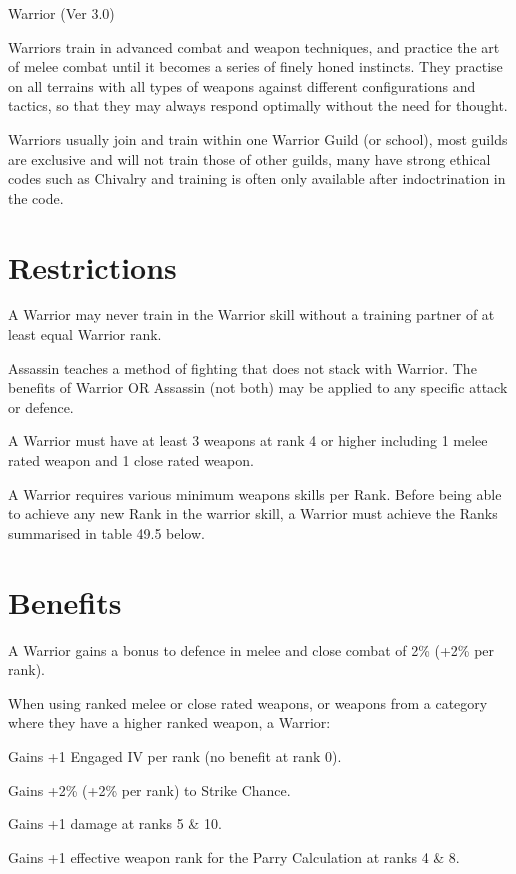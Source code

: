 \begin{Chapter}{Warrior (Ver 3.0)}

Warriors train in advanced combat and weapon techniques, and practice
the art of melee combat until it becomes a series of finely honed
instincts.  They practise on all terrains with all types of weapons
against different configurations and tactics, so that they may always
respond optimally without the need for thought.

Warriors usually join and train within one Warrior Guild (or school),
most guilds are exclusive and will not train those of other guilds,
many have strong ethical codes such as Chivalry and training is often
only available after indoctrination in the code.

\section{Restrictions}

A Warrior may never train in the Warrior skill without a training
partner of at least equal Warrior rank.

Assassin teaches a method of fighting that does not stack with
Warrior.  The benefits of Warrior OR Assassin (not both) may be
applied to any specific attack or defence.

A Warrior must have at least 3 weapons at rank 4 or higher including 1
melee rated weapon and 1 close rated weapon.

A Warrior requires various minimum weapons skills per Rank.  Before
being able to achieve any new Rank in the warrior skill, a Warrior
must achieve the Ranks summarised in table 49.5 below.

\section{Benefits}

A Warrior gains a bonus to defence in melee and close combat of 2\%
(+2\% per rank).

When using ranked melee or close rated weapons, or weapons from a
category where they have a higher ranked weapon, a Warrior:

\begin{Itemize}
\item Gains +1 Engaged IV per rank (no benefit at rank 0).
\item Gains +2\% (+2\% per rank) to Strike Chance.
\item Gains +1 damage at ranks 5 \& 10.
\item Gains +1 effective weapon rank for the Parry Calculation at ranks 4 \& 8. 
\end{Itemize}


\end{Chapter}
